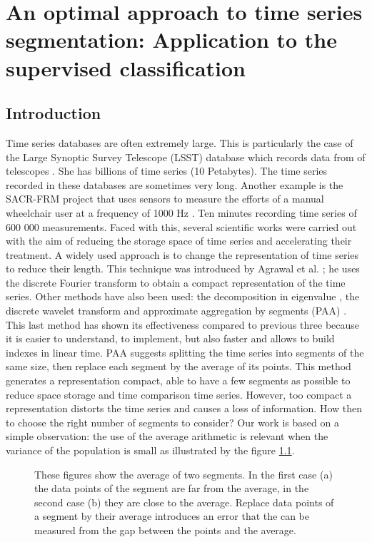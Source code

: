 \chapter{An optimal approach to time series segmentation: Application to the supervised classification}

\section{Introduction}
Time series databases are often extremely large. This is particularly the case of the Large Synoptic Survey Telescope (LSST) database which records data from of telescopes \cite {lsst}. She has billions of time series (10 Petabytes). The time series recorded in these databases are sometimes very long. Another example is the  SACR-FRM project that uses sensors to measure the efforts of a  manual wheelchair user at a frequency of 1000 Hz \cite{SACR-FRM}. Ten minutes recording time series of 600 000 measurements. Faced with this, several scientific works were carried out with the aim of reducing the storage space of time series and accelerating their treatment.  A widely used approach is to change the representation of time series to reduce their length. This technique was introduced by Agrawal et al. \cite{Agrawal1993}; he uses the discrete Fourier transform to obtain a compact representation of the time series.
 Other methods have also been used: the decomposition in eigenvalue \cite{Wu1996}, the  discrete wavelet transform \cite{Chan1999} and approximate aggregation by
 segments (PAA) \cite{keogh2001locally}. This last method has shown its effectiveness compared to previous three because it is easier to understand, to implement, but also faster and allows to build indexes in linear time. PAA suggests splitting the time series into segments of the same size, then replace each segment by the average of its points. This method generates a representation compact, able to have a few segments as possible to reduce space storage and time comparison time series.
 However, too compact a representation distorts the time series and causes a loss of information. How then to choose the right number of segments to consider? Our work is based on a simple observation: the use of the average arithmetic is relevant when the variance of the population is small as illustrated by the figure \ref{fig:average}.
 
 

\begin{figure}
\centering
{} 
\caption{These figures show the average of two segments. In the first
case (a) the data points of the segment are far from the average, in the second case (b) they are close to the average. Replace data points of a segment by their average introduces an error that the can be measured from the gap between the points and the average. }

\label{fig:average}
\end{figure}


